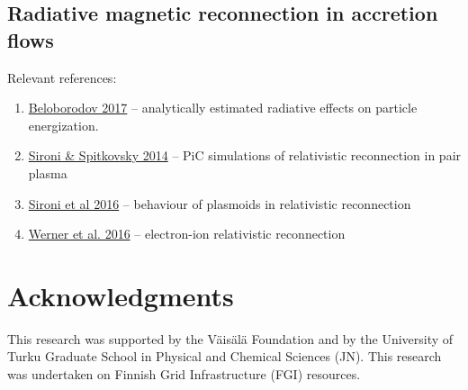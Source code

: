 \documentclass{aa}
\begin{document}
\subsection{Radiative magnetic reconnection in accretion flows}

Relevant references:
\begin{enumerate}
\item \href{http://adsabs.harvard.edu/abs/2017arXiv170102847B}{Beloborodov 2017} -- analytically estimated radiative effects on particle energization.
\item \href{http://adsabs.harvard.edu/abs/2014ApJ...783L..21S}{Sironi \& Spitkovsky 2014} -- PiC simulations of relativistic reconnection in pair plasma
\item \href{http://adsabs.harvard.edu/abs/2016MNRAS.462...48S}{Sironi et al 2016} -- behaviour of plasmoids in relativistic reconnection 
\item \href{http://adsabs.harvard.edu/abs/2016arXiv161204493W}{Werner et al. 2016} -- electron-ion relativistic reconnection
\end{enumerate}

\section*{Acknowledgments}
This research was supported by the V\"ais\"al\"a Foundation and by the University of Turku Graduate School in Physical and Chemical Sciences (JN).
This research was undertaken on Finnish Grid Infrastructure (FGI) resources.








\clearpage
%
\end{document}
